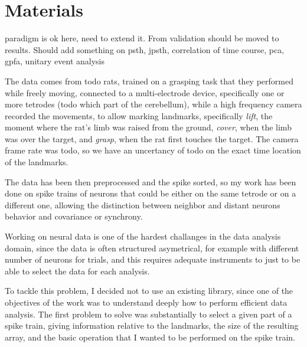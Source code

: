 \section{Materials}

paradigm is ok here, need to extend it.
From validation should be moved to results.
Should add something on psth, jpsth, correlation of time course, pca, gpfa, unitary event analysis

The data comes from todo rats, trained on a grasping task that they performed while freely moving, connected to a multi-electrode device, specifically one or more tetrodes (todo which part of the cerebellum), while a high frequency camera recorded the movements, to allow marking landmarks, specifically \emph{lift}, the moment where the rat's limb was raised from the ground, \emph{cover}, when the limb was over the target, and \emph{grasp}, when the rat first touches the target. The camera frame rate was todo, so we have an uncertancy of todo on the exact time location of the landmarks.

The data has been then preprocessed and the spike sorted, so my work has been done on spike trains of neurons that could be either on the same tetrode or on a different one, allowing the distinction between neighbor and distant neurons behavior and covariance or synchrony.


Working on neural data is one of the hardest challanges in the data analysis domain, since the data is often structured asymetrical, for example with different number of neurons for trials, and this requires adequate instruments to just to be able to select the data for each analysis.

To tackle this problem, I decided not to use an existing library, since one of the objectives of the work was to understand deeply how to perform efficient data analysis. 
The first problem to solve was substantially to select a given part of a spike train, giving information relative to the landmarks, the size of the resulting array, and the basic operation that I wanted to be performed on the spike train.

